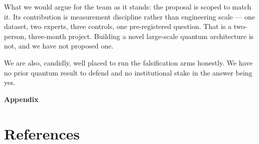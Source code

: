 \documentclass[10pt,a4paper]{article}
\begin{document}
What we would argue for the team as it stands: the proposal is scoped to match it. Its contribution is measurement discipline rather than engineering scale --- one dataset, two experts, three controls, one pre-registered question. That is a two-person, three-month project. Building a novel large-scale quantum architecture is not, and we have not proposed one.

We are also, candidly, well placed to run the falsification arms honestly. We have no prior quantum result to defend and no institutional stake in the answer being yes.

\clearpage
\setcounter{section}{0}
\renewcommand{\thesection}{A\arabic{section}}

\begin{center}\textbf{\large Appendix}\end{center}

\section{References}
\end{document}
